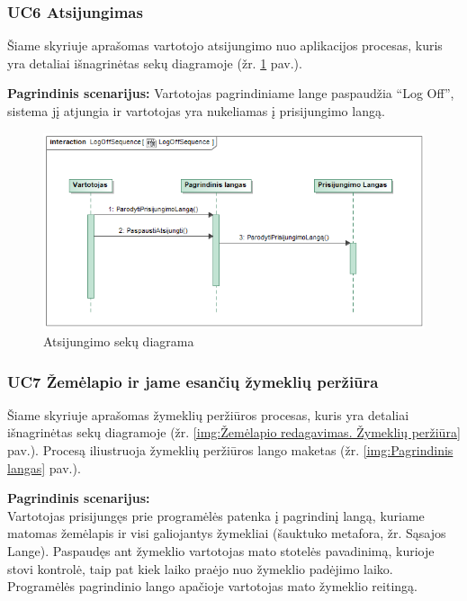 \documentclass{VUMIFPSkursinis}
\begin{document}
\subsubsection{UC6 Atsijungimas}
	Šiame skyriuje aprašomas vartotojo atsijungimo nuo aplikacijos procesas,  kuris yra detaliai išnagrinėtas sekų diagramoje (žr. \ref{img:Atsijungimo sekų diagrama} pav.).
	
	\textbf{Pagrindinis scenarijus:}
	Vartotojas pagrindiniame lange paspaudžia “Log Off”, sistema jį atjungia ir vartotojas yra nukeliamas į prisijungimo langą.
		\begin{figure}[H]
				\centering
				\includegraphics[scale=0.6]{img/LogOffSequence}
				\caption{Atsijungimo sekų diagrama}
				\label{img:Atsijungimo sekų diagrama}
			\end{figure}

\subsubsection{UC7 Žemėlapio ir jame esančių žymeklių peržiūra}
	Šiame skyriuje aprašomas žymeklių peržiūros procesas,  kuris yra detaliai išnagrinėtas sekų diagramoje (žr. \ref{img:Žemėlapio redagavimas. Žymeklių peržiūra} pav.). 
	Procesą iliustruoja žymeklių peržiūros lango maketas (žr. \ref{img:Pagrindinis langas} pav.).

	\textbf{Pagrindinis scenarijus:}\\
	Vartotojas prisijungęs prie programėlės patenka į pagrindinį langą, kuriame matomas žemėlapis ir visi galiojantys žymekliai (šauktuko metafora, žr. Sąsajos Lange). Paspaudęs ant žymeklio vartotojas mato stotelės pavadinimą, kurioje stovi kontrolė, taip pat kiek laiko praėjo nuo žymeklio padėjimo laiko. Programėlės pagrindinio lango apačioje vartotojas mato žymeklio reitingą.
	
\end{document}
